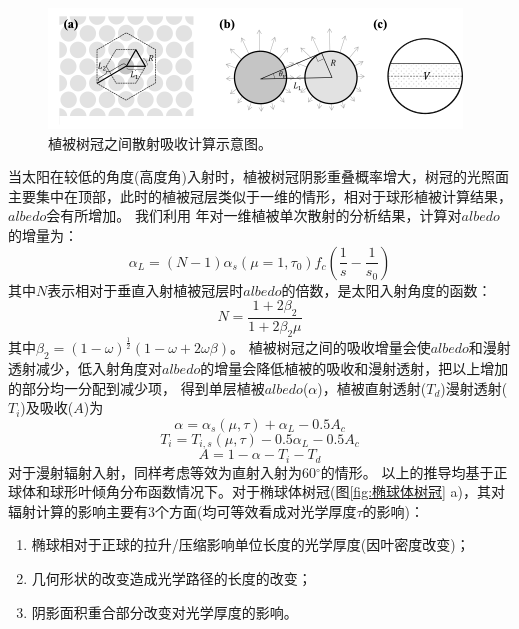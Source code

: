 {
\begin{figure}[]
\centering
\includegraphics{Figures/辐射过程及辐射通量计算/散射吸收计算示意图.png}
\caption{植被树冠之间散射吸收计算示意图。}
\label{fig:散射吸收计算示意图}
\end{figure}
}

当太阳在较低的角度(高度角)入射时，植被树冠阴影重叠概率增大，树冠的光照面主要集中在顶部，此时的植被冠层类似于一维的情形，相对于球形植被计算结果，$albedo$会有所增加。
我们利用 \citet{dickinson1983land} 年对一维植被单次散射的分析结果，计算对$albedo$的增量为：
\begin{equation}
\alpha_{L}=(N-1) \alpha_{s}\left(\mu=1, \tau_{0}\right) f_{c}\left(\frac{1}{s}-\frac{1}{s_{0}}\right)
\end{equation}
其中$N$表示相对于垂直入射植被冠层时$albedo$的倍数，是太阳入射角度的函数：
\begin{equation}
N=\frac{1+2 \beta_{2}}{1+2 \beta_{2} \mu}
\end{equation}
其中$\beta_2=\left(1-\omega\right)^\frac{1}{2}(1-\omega+2\omega\beta)$。
植被树冠之间的吸收增量会使$albedo$和漫射透射减少，低入射角度对$albedo$的增量会降低植被的吸收和漫射透射，把以上增加的部分均一分配到减少项，
得到单层植被$albedo$($\alpha$)，植被直射透射($T_d$)漫射透射($T_i$)及吸收($A$)为
\begin{equation}
\alpha=\alpha_{s}(\mu, \tau)+\alpha_{L}-0.5 A_{c}
\end{equation}
\begin{equation}
T_{i}=T_{i, s}(\mu, \tau)-0.5 \alpha_{L}-0.5 A_{c}
\end{equation}
\begin{equation}
A=1-\alpha-T_{i}-T_{d}
\end{equation}
对于漫射辐射入射，同样考虑等效为直射入射为60$^\circ$的情形。
以上的推导均基于正球体和球形叶倾角分布函数情况下。对于椭球体树冠(图\ref{fig:椭球体树冠} a)，其对辐射计算的影响主要有3个方面(均可等效看成对光学厚度$\tau$的影响)：
\begin{enumerate}
    \item 椭球相对于正球的拉升/压缩影响单位长度的光学厚度(因叶密度改变)；
    \item 几何形状的改变造成光学路径的长度的改变；
    \item 阴影面积重合部分改变对光学厚度的影响。
\end{enumerate}

